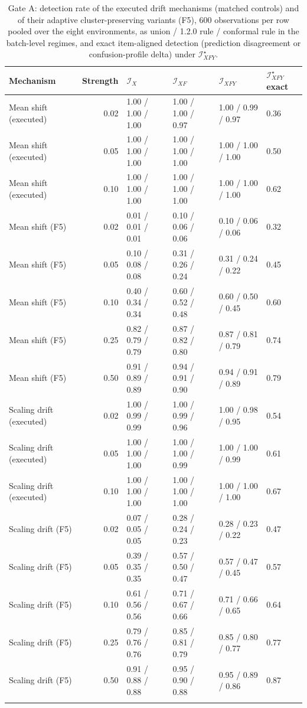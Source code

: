 \begin{table}[!tbp]
\caption{Gate A: detection rate of the executed drift mechanisms (matched controls) and of their adaptive cluster-preserving variants (F5), 600 observations per row pooled over the eight environments, as union / 1.2.0 rule / conformal rule in the batch-level regimes, and exact item-aligned detection (prediction disagreement or confusion-profile delta) under $\mathcal I_{XFY}^{\star}$.}
\label{tab:s-adversarial-detection}
\centering
\scriptsize
\setlength{\tabcolsep}{3pt}
\begin{tabular}{@{}lrllll@{}}
\toprule
Mechanism & Strength & $\mathcal I_X$ & $\mathcal I_{XF}$ & $\mathcal I_{XFY}$ & $\mathcal I_{XFY}^{\star}$ exact \\
\midrule
Mean shift (executed) & 0.02 & 1.00 / 1.00 / 1.00 & 1.00 / 1.00 / 0.97 & 1.00 / 0.99 / 0.97 & 0.36 \\
Mean shift (executed) & 0.05 & 1.00 / 1.00 / 1.00 & 1.00 / 1.00 / 1.00 & 1.00 / 1.00 / 1.00 & 0.50 \\
Mean shift (executed) & 0.10 & 1.00 / 1.00 / 1.00 & 1.00 / 1.00 / 1.00 & 1.00 / 1.00 / 1.00 & 0.62 \\
Mean shift (F5) & 0.02 & 0.01 / 0.01 / 0.01 & 0.10 / 0.06 / 0.06 & 0.10 / 0.06 / 0.06 & 0.32 \\
Mean shift (F5) & 0.05 & 0.10 / 0.08 / 0.08 & 0.31 / 0.26 / 0.24 & 0.31 / 0.24 / 0.22 & 0.45 \\
Mean shift (F5) & 0.10 & 0.40 / 0.34 / 0.34 & 0.60 / 0.52 / 0.48 & 0.60 / 0.50 / 0.45 & 0.60 \\
Mean shift (F5) & 0.25 & 0.82 / 0.79 / 0.79 & 0.87 / 0.82 / 0.80 & 0.87 / 0.81 / 0.79 & 0.74 \\
Mean shift (F5) & 0.50 & 0.91 / 0.89 / 0.89 & 0.94 / 0.91 / 0.90 & 0.94 / 0.91 / 0.89 & 0.79 \\
\addlinespace[1pt]
Scaling drift (executed) & 0.02 & 1.00 / 0.99 / 0.99 & 1.00 / 0.99 / 0.96 & 1.00 / 0.98 / 0.95 & 0.54 \\
Scaling drift (executed) & 0.05 & 1.00 / 1.00 / 1.00 & 1.00 / 1.00 / 0.99 & 1.00 / 1.00 / 0.99 & 0.61 \\
Scaling drift (executed) & 0.10 & 1.00 / 1.00 / 1.00 & 1.00 / 1.00 / 1.00 & 1.00 / 1.00 / 1.00 & 0.67 \\
Scaling drift (F5) & 0.02 & 0.07 / 0.05 / 0.05 & 0.28 / 0.24 / 0.23 & 0.28 / 0.23 / 0.22 & 0.47 \\
Scaling drift (F5) & 0.05 & 0.39 / 0.35 / 0.35 & 0.57 / 0.50 / 0.47 & 0.57 / 0.47 / 0.45 & 0.57 \\
Scaling drift (F5) & 0.10 & 0.61 / 0.56 / 0.56 & 0.71 / 0.67 / 0.66 & 0.71 / 0.66 / 0.65 & 0.64 \\
Scaling drift (F5) & 0.25 & 0.79 / 0.76 / 0.76 & 0.85 / 0.81 / 0.79 & 0.85 / 0.80 / 0.77 & 0.77 \\
Scaling drift (F5) & 0.50 & 0.91 / 0.88 / 0.88 & 0.95 / 0.90 / 0.88 & 0.95 / 0.89 / 0.86 & 0.87 \\
\addlinespace[1pt]
\bottomrule
\end{tabular}
\end{table}
